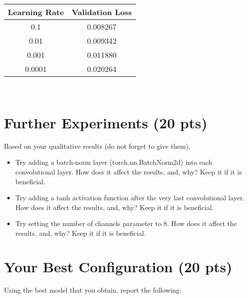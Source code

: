 \documentclass[12pt]{article}
\begin{document}
\begin{itemize}
\begin{minipage}{\textwidth}
\begin{minipage}{0.49\textwidth}
\begin{tabular}{ | c | c | }
				  \hline			
				  \bf Learning Rate & \bf Validation Loss \\
				  \hline		
				  0.1 & 0.008267 \\
				  \hline	
				  0.01 & 0.009342 \\
				  \hline	
				  0.001 & 0.011880 \\
				  \hline
				  0.0001 & 0.020264 \\
				  \hline
				\end{tabular}
				\captionsetup{width=.8\textwidth}
			\end{minipage}
		\end{minipage} \\

    \end{itemize}


\section{Further Experiments (20 pts)}
    Based on your qualitative results (do not forget to give them),
    \begin{itemize}
        \item Try adding a batch-norm layer (torch.nn.BatchNorm2d) into each convolutional layer. How does it affect the results, and, why? Keep it if it is beneficial. 
        
        \item Try adding a tanh activation function after the very last convolutional layer. How does it affect the results, and, why? Keep it if it is beneficial. 
        
        \item Try setting the number of channels parameter to 8. How does it affect the results, and, why? Keep it if it is beneficial. 
        
      
    \end{itemize}


\section{Your Best Configuration (20 pts)}
Using the best model that you obtain, report the following:
 
\end{document}
